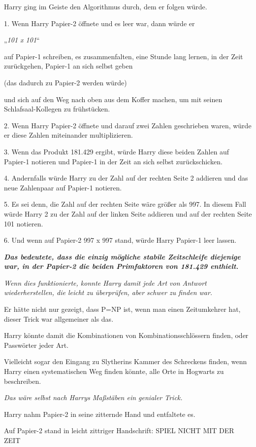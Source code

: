 {Harry ging im Geiste den Algorithmus durch, dem er folgen würde.

1. Wenn Harry Papier-2 öffnete und es leer war, dann würde er

„\emph{101 x 101}“

auf Papier-1 schreiben, es zusammenfalten, eine Stunde lang lernen, in der Zeit zurückgehen, Papier-1 an sich selbst geben

(das dadurch zu Papier-2 werden würde)

und sich auf den Weg nach oben aus dem Koffer machen, um mit seinen Schlafsaal-Kollegen zu frühstücken.

2. Wenn Harry Papier-2 öffnete und darauf zwei Zahlen geschrieben waren, würde er diese Zahlen miteinander multiplizieren.

3. Wenn das Produkt 181.429 ergibt, würde Harry diese beiden Zahlen auf Papier-1 notieren und Papier-1 in der Zeit an sich selbst zurückschicken.

4. Andernfalls würde Harry zu der Zahl auf der rechten Seite 2 addieren und das neue Zahlenpaar auf Papier-1 notieren.

5. Es sei denn, die Zahl auf der rechten Seite wäre größer als 997. In diesem Fall würde Harry 2 zu der Zahl auf der linken Seite addieren und auf der rechten Seite 101 notieren.

6. Und wenn auf Papier-2 997 x 997 stand, würde Harry Papier-1 leer lassen.

\textbf{\emph{Das bedeutete, dass die einzig mögliche stabile Zeitschleife diejenige war, in der Papier-2 die beiden Primfaktoren von 181.429 enthielt.}}

\emph{Wenn dies funktionierte, konnte Harry damit jede Art von Antwort wiederherstellen, die leicht zu überprüfen, aber schwer zu finden war.}

Er hätte nicht nur gezeigt, dass P=NP ist, wenn man einen Zeitumkehrer hat, dieser Trick war allgemeiner als das.

Harry könnte damit die Kombinationen von Kombinationsschlössern finden, oder Passwörter jeder Art.

Vielleicht sogar den Eingang zu Slytherins Kammer des Schreckens finden, wenn Harry einen systematischen Weg finden könnte, alle Orte in Hogwarts zu beschreiben.

\emph{Das wäre selbst nach Harrys Maßstäben ein genialer Trick.}

Harry nahm Papier-2 in seine zitternde Hand und entfaltete es.

Auf Papier-2 stand in leicht zittriger Handschrift: SPIEL NICHT MIT DER ZEIT

}
